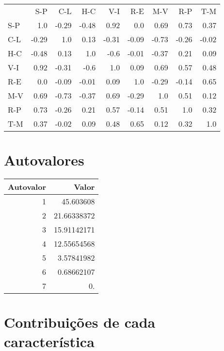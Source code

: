 \documentclass[11pt]{article}
\begin{document}
\begin{center}
\begin{tabular}{lrrrrrrrr}
      &    S-P  &    C-L  &    H-C  &    V-I  &    R-E  &    M-V  &    R-P  &    T-M  \\
 S-P  &    1.0  &  -0.29  &  -0.48  &   0.92  &    0.0  &   0.69  &   0.73  &   0.37  \\
 C-L  &  -0.29  &    1.0  &   0.13  &  -0.31  &  -0.09  &  -0.73  &  -0.26  &  -0.02  \\
 H-C  &  -0.48  &   0.13  &    1.0  &   -0.6  &  -0.01  &  -0.37  &   0.21  &   0.09  \\
 V-I  &   0.92  &  -0.31  &   -0.6  &    1.0  &   0.09  &   0.69  &   0.57  &   0.48  \\
 R-E  &    0.0  &  -0.09  &  -0.01  &   0.09  &    1.0  &  -0.29  &  -0.14  &   0.65  \\
 M-V  &   0.69  &  -0.73  &  -0.37  &   0.69  &  -0.29  &    1.0  &   0.51  &   0.12  \\
 R-P  &   0.73  &  -0.26  &   0.21  &   0.57  &  -0.14  &   0.51  &    1.0  &   0.32  \\
 T-M  &   0.37  &  -0.02  &   0.09  &   0.48  &   0.65  &   0.12  &   0.32  &    1.0  \\
\end{tabular}
\end{center}
\section{Autovalores}
\label{sec-4}



\begin{center}
\begin{tabular}{rr}
 Autovalor  &        Valor  \\
\hline
         1  &    45.603608  \\
         2  &  21.66338372  \\
         3  &  15.91142171  \\
         4  &  12.55654568  \\
         5  &   3.57841982  \\
         6  &   0.68662107  \\
         7  &           0.  \\
\end{tabular}
\end{center}
\section{Contribuições de cada característica}
\label{sec-5}
\end{document}
